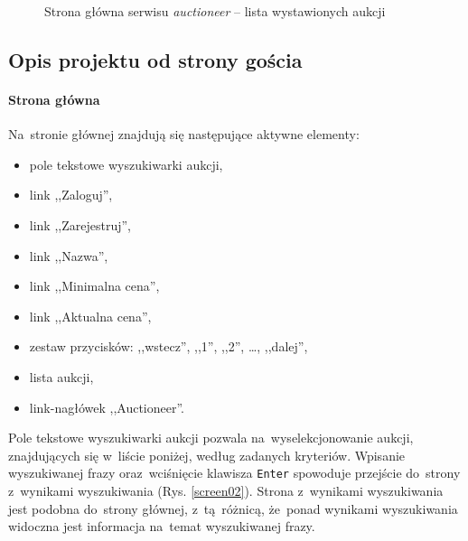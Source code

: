 \begin{figure}[h]
\centering
{}
\caption{Strona główna serwisu \textit{auctioneer} -- lista wystawionych aukcji}
\label{screen01}
\end{figure}

\subsection{Opis projektu od strony gościa}

\paragraph{Strona główna}

Na~stronie głównej znajdują się następujące aktywne elementy:

\begin{itemize}
  \item pole tekstowe wyszukiwarki aukcji,
  \item link ,,Zaloguj'',
  \item link ,,Zarejestruj'',
  \item link ,,Nazwa'',
  \item link ,,Minimalna cena'',
  \item link ,,Aktualna cena'',
  \item zestaw przycisków: ,,wstecz'', ,,1'', ,,2'', \ldots, ,,dalej'',
  \item lista aukcji,
  \item link-nagłówek ,,Auctioneer''.
\end{itemize}

Pole tekstowe wyszukiwarki aukcji pozwala na~wyselekcjonowanie aukcji, znajdujących się w~liście poniżej, według zadanych kryteriów. Wpisanie wyszukiwanej frazy oraz~wciśnięcie klawisza \texttt{Enter} spowoduje przejście do~strony z~wynikami wyszukiwania (Rys. \ref{screen02}). Strona z~wynikami wyszukiwania jest podobna do~strony głównej, z~tą~różnicą, że~ponad wynikami wyszukiwania widoczna jest informacja na~temat wyszukiwanej frazy.


